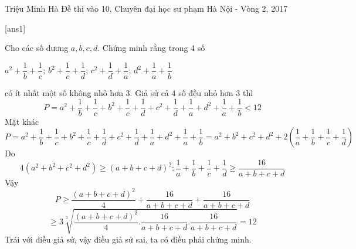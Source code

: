 \begin{name}
{Triệu Minh Hà}
{Đề thi vào 10, Chuyên đại học sư phạm Hà Nội - Vòng 2, 2017}
\end{name}
\setcounter{ex}{0}
[ans1]
\begin{ex}%
Cho các số dương $a,b,c,d$. Chứng minh rằng trong 4 số
 \begin{center}
 $a^2+\dfrac{1}{b}+\dfrac{1}{c};\,b^2+\dfrac{1}{c}+\dfrac{1}{d};\,c^2+\dfrac{1}{d}+\dfrac{1}{a};\,d^2+\dfrac{1}{a}+\dfrac{1}{b}$
 \end{center}
có ít nhất một số không nhỏ hơn 3.
\loigiai
    {Giả sử cả 4 số đều nhỏ hơn 3 thì\\
    $$P=a^2+\dfrac{1}{b}+\dfrac{1}{c}+b^2+\dfrac{1}{c}+\dfrac{1}{d}+c^2+\dfrac{1}{d}+\dfrac{1}{a}+d^2+\dfrac{1}{a}+\dfrac{1}{b}<12$$
    Mặt khác
    $$P=a^2+\dfrac{1}{b}+\dfrac{1}{c}+b^2+\dfrac{1}{c}+\dfrac{1}{d}+c^2+\dfrac{1}{d}+\dfrac{1}{a}+d^2+\dfrac{1}{a}+\dfrac{1}{b}=a^2+b^2+c^2+d^2+2\left(\dfrac{1}{a}+\dfrac{1}{b}+\dfrac{1}{c}+\dfrac{1}{d}\right)$$
    Do $$4\left(a^2+b^2+c^2+d^2\right)\geq (a+b+c+d)^2;\dfrac{1}{a}+\dfrac{1}{b}+\dfrac{1}{c}+\dfrac{1}{d}\geq \dfrac{16}{a+b+c+d}$$
    Vậy
    $$P\geq \dfrac{(a+b+c+d)^2}{4}+\dfrac{16}{a+b+c+d}+\dfrac{16}{a+b+c+d}$$ 
    $$\geq 3\sqrt[3]{\dfrac{(a+b+c+d)^2}{4}.\dfrac{16}{a+b+c+d}.\dfrac{16}{a+b+c+d}}=12$$
    Trái với điều giả sử, vậy điều giả sử sai, ta có điều phải chứng minh.
    }
\end{ex}

